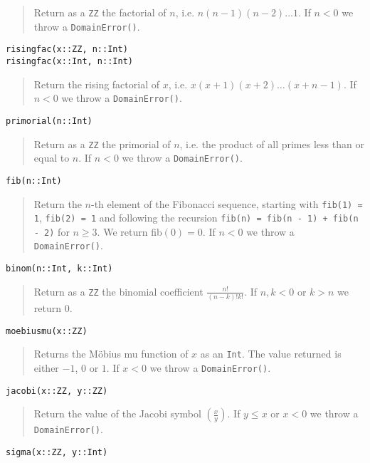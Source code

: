 \documentclass[a4paper,10pt]{article}
\newcommand{\code}{\lstinline}
\newcommand{\desc}[1]{\vspace{-3mm}\begin{quote}#1\end{quote}}
\newcommand{\ljk}[2]{\left(\frac{#1}{#2}\right)}
\begin{document}
{{{\desc{Return as a \code{ZZ} the factorial of $n$, i.e. $n(n - 1)(n - 2)\ldots 1$.
If $n < 0$ we throw a \code{DomainError()}.}

\begin{lstlisting}
risingfac(x::ZZ, n::Int)
risingfac(x::Int, n::Int)
\end{lstlisting}

\desc{Return the rising factorial of $x$, i.e. $x(x + 1)(x + 2)\ldots (x + n - 1)$.
If $n < 0$ we throw a \code{DomainError()}.}

\begin{lstlisting}
primorial(n::Int)
\end{lstlisting}

\desc{Return as a \code{ZZ} the primorial of $n$, i.e. the product of all primes
less than or equal to $n$. If $n < 0$ we throw a \code{DomainError()}.}

\begin{lstlisting}
fib(n::Int)
\end{lstlisting}

\desc{Return the $n$-th element of the Fibonacci sequence, starting with 
\code{fib(1) = 1}, \code{fib(2) = 1} and following the recursion 
\code{fib(n) = fib(n - 1) + fib(n - 2)} for $n \geq 3$.
We return fib$(0) = 0$. If $n < 0$ we throw a \code{DomainError()}.}

\begin{lstlisting}
binom(n::Int, k::Int)
\end{lstlisting}

\desc{Return as a \code{ZZ} the binomial coefficient $\frac{n!}{(n - k)!k!}$. If
$n, k < 0$ or $k > n$ we return $0$.}

\begin{lstlisting}
moebiusmu(x::ZZ)
\end{lstlisting}

\desc{Returns the M\"{o}bius mu function of $x$ as an \code{Int}. The value returned is
either $-1$, $0$ or $1$. If $x < 0$ we throw a \code{DomainError()}.}

\begin{lstlisting}
jacobi(x::ZZ, y::ZZ)
\end{lstlisting}

\desc{Return the value of the Jacobi symbol $\ljk{x}{y}$. If $y \leq x$ or $x < 0$ we
throw a \code{DomainError()}.}

\begin{lstlisting}
sigma(x::ZZ, y::Int)
\end{lstlisting}

}}}
\end{document}
